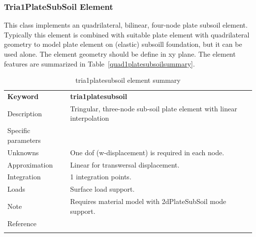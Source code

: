 \documentclass[a4paper]{article}
\newcommand{\templabel}{}%
\newcommand{\tempcaption}{}%
\newcounter{nelpar}
\newenvironment{elementsummary}[5]{%
  \gdef\tempcaption{#4}%
  \gdef\templabel{#5}%
  \setcounter{nelpar}{0}%
  \begin{center} %
    \begin{table}[!htb] %
      \begin{tabular}{|l|p{9cm}|}\hline %
        {\bf Keyword} & \bf{#1}\\ %
        {Description} & {#2}\\ %
        {Specific parameters} & {#3}\\ \hline %
}{
  \\ \hline %
      \end{tabular}%
      \caption{\tempcaption}%
      \label{\templabel}%
    \end{table}%
  \end{center}%
}
\newcommand{\elementDescription}[2]{{#1} & {#2}\\}
\begin{document}
\subsubsection{Tria1PlateSubSoil Element} \label{tria1platesubsoil}
This class implements an quadrilateral, bilinear, four-node plate subsoil element.
Typically this element is combined with suitable plate element with quadrilateral geometry to model plate element on 
(elastic) subsoill foundation, but it can be used alone. The element geometry should be define in xy plane.
The element features are summarized in Table~\ref{quad1platesubsoilsummary}.

\begin{elementsummary}{tria1platesubsoil}{Tringular, three-node sub-soil plate element with linear interpolation}{}{tria1platesubsoil element summary}{tria1platesubsoilsummary}
\elementDescription{Unknowns}{One dof (w-displacement) is required in each node.}
\elementDescription{Approximation}{Linear for transwersal displacement.}
\elementDescription{Integration}{1 integration points.}
\elementDescription{Loads}{Surface load support.}
\elementDescription{Note}{Requires material model with 2dPlateSubSoil mode support.}
\elementDescription{Reference}{\cite{BittnarSejnoha1996}}
\end{elementsummary}


\clearpage
\end{document}
